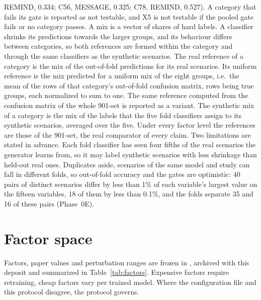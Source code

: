 \documentclass[11pt,a4paper]{article}
\newcommand{\prop}[1]{#1}
\newcommand{\prop}[1]{\textcolor{blue}{#1}}
\begin{document}
\begin{description}[style=nextline]
  REMIND, 0.334; C56, MESSAGE, 0.325; C78, REMIND, 0.527). A category that
  fails its gate is reported as not testable, and X5 is not testable if the
  pooled gate fails or no category passes. A mix is a vector of shares of
  hard labels. A classifier shrinks its predictions towards the larger
  groups, and its behaviour differs between categories, so both references
  are formed within the category and through the same classifiers as the
  synthetic scenarios. The real reference of a category is the mix of the
  out-of-fold predictions for its real scenarios. Its uniform reference is
  the mix predicted for a uniform mix of the eight groups, i.e.\ the mean
  of the rows of that category's out-of-fold confusion matrix, rows being
  true groups, each normalized to sum to one. The same reference computed
  from the confusion matrix of the whole 901-set is reported as a variant.
  The synthetic mix of a category is the mix of the labels that the five
  fold classifiers assign to its synthetic scenarios, averaged over the
  five. Under every factor level the references are those of the 901-set,
  the real comparator of every claim. Two limitations are stated in
  advance. Each fold classifier has seen four fifths of the real scenarios
  the generator learns from, so it may label synthetic scenarios with less
  shrinkage than held-out real ones. \prop{Duplicates aside,
  scenarios} of the same model and study can fall in different folds, so
  out-of-fold accuracy and the gates are \prop{optimistic: 40 pairs of
  distinct scenarios differ by less than 1\% of each variable's largest
  value on the fifteen variables, 18 of them by less than 0.1\%, and the
  folds separate 35 and 16 of these pairs (Phase~0E).}
\end{description}

\section{Factor space}\label{sec:factors}
Factors, paper values and perturbation ranges are frozen in
, archived with this deposit and summarized
in Table~\ref{tab:factors}. Expensive factors require retraining, cheap
factors vary per trained model. Where the configuration file and this
protocol disagree, the protocol governs.
\end{document}
